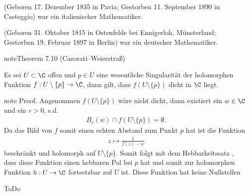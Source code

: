 \documentclass[letterpaper,10pt,german]{jupyterBook}
\begin{document}
\begin{sphinxShadowBox}

\sphinxAtStartPar
{} (Geboren 17. Dezember 1835 in Pavia; Gestorben 11. September 1890 in Casteggio) war ein italienischer Mathematiker.
\end{sphinxShadowBox}

\begin{sphinxShadowBox}

\sphinxAtStartPar
{} (Geboren 31. Oktober 1815 in Ostenfelde bei Ennigerloh, Münsterland; Gestorben 19. Februar 1897 in Berlin) war ein deutscher Mathematiker.
\end{sphinxShadowBox}
\label{complexanalysis/residuensatz:theorem-9}
\begin{sphinxadmonition}{note}{Theorem 7.10 (Casorati–Weierstraß)}



\sphinxAtStartPar
Es sei \(U \subset \C\) offen und \(p\in U\) eine wesentliche Singularität der holomorphen Funktion \(f:U\setminus\{p\}\to\C\), dann gilt, dass \(f(U\setminus\{p\})\) dicht in \(\C\) liegt.
\end{sphinxadmonition}

\begin{sphinxadmonition}{note}
\sphinxAtStartPar
Proof. Angenommen \(f(U\setminus\{p\})\) wäre nicht dicht, dann existiert ein \(w\in\C\) und ein \(r>0\), s.d.
\begin{equation*}
\begin{split}B_r(w) \cap f(U\setminus\{p\}) = \emptyset.\end{split}
\end{equation*}
\sphinxAtStartPar
Da das Bild von \(f\) somit einen echten Abstand zum Punkt \(p\) hat ist die Funktion
\begin{equation*}
\begin{split}z\mapsto\frac{1}{f(z) - w}\end{split}
\end{equation*}
\sphinxAtStartPar
beschränkt und holomorph auf \(U\setminus\{p\}\). Somit folgt mit dem Hebbarkeitssatz {\hyperref[\detokenize{complexanalysis/residuensatz:thm:hebbar}]{}}, dass diese Funktion einen hebbaren Pol bei \(p\) hat und somit zur holomorphen Funktion \(h:U\to\C\) fortsetzbar auf \(U\) ist. Diese Funktion hat keine Nullstellen

\sphinxAtStartPar
ToDo
\end{sphinxadmonition}
\end{document}
